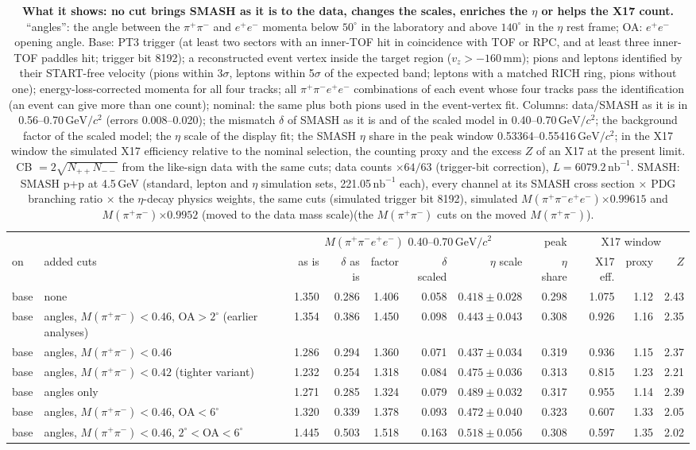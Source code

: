 \documentclass[11pt,a4paper]{article}
\newcommand{\ee}{\ensuremath{e^{+}e^{-}}\xspace}
\newcommand{\pipi}{\ensuremath{\pi^{+}\pi^{-}}\xspace}
\newcommand{\ppee}{\ensuremath{\pi^{+}\pi^{-}e^{+}e^{-}}\xspace}
\newcommand{\Mfour}{\ensuremath{M(\pi^{+}\pi^{-}e^{+}e^{-})}\xspace}
\newcommand{\Mpipi}{\ensuremath{M(\pi^{+}\pi^{-})}\xspace}
\newcommand{\nbinv}{\ensuremath{\mathrm{nb}^{-1}}\xspace}
\newcommand{\GeVcc}{\ensuremath{\mathrm{GeV}/c^{2}}\xspace}
\newcommand{\vz}{\ensuremath{v_z}\xspace}
\newcommand{\ptthree}{PT3 trigger (at least two sectors with an inner-TOF hit in coincidence with TOF or RPC, and at least three
inner-TOF paddles hit; trigger bit 8192)\xspace}
\newcommand{\selid}{pions and leptons identified by their START-free velocity (pions within 3$\sigma$, leptons within 5$\sigma$ of the
expected band; leptons with a matched RICH ring, pions without one); energy-loss-corrected momenta for all four tracks; all \ppee
combinations of each event whose four tracks pass the identification (an event can give more than one count)\xspace}
\newcommand{\selbase}{\ptthree; a reconstructed event vertex inside the target region ($\vz>-160$\,mm); \selid}
\newcommand{\smashsel}{SMASH p+p at 4.5\,GeV (standard, lepton and $\eta$ simulation sets, 221.05\,\nbinv each), every channel at its
SMASH cross section $\times$ PDG branching ratio $\times$ the $\eta$-decay physics weights, the same cuts (simulated trigger bit 8192),
simulated \Mfour$\times0.99615$ and \Mpipi$\times0.9952$ (moved to the data mass scale)\xspace}
\newcommand{\lumisel}{data counts $\times64/63$ (trigger-bit correction), $L=6079.2\,\nbinv$\xspace}
\begin{document}
\begin{table}[!htbp]
\centering
\caption{\textbf{What it shows: no cut brings SMASH as it is to the data, changes the scales, enriches the $\eta$ or helps the X17 count.}
``angles'': the angle between the \pipi and \ee momenta below $50^\circ$ in the laboratory and above $140^\circ$ in the $\eta$ rest frame; OA: \ee
opening angle. Base: \selbase; nominal: the same plus both pions used in the event-vertex fit. Columns: data/SMASH as it is in 0.56--0.70\,\GeVcc
(errors 0.008--0.020); the mismatch $\delta$ of SMASH as it is and of the scaled model in 0.40--0.70\,\GeVcc; the background factor of the scaled
model; the $\eta$ scale of the display fit; the SMASH $\eta$ share in the peak window 0.53364--0.55416\,\GeVcc; in the X17 window the simulated
X17 efficiency relative to the nominal selection, the counting proxy and the excess $Z$ of an X17 at the present limit. CB $=2\sqrt{N_{++}N_{--}}$
from the like-sign data with the same cuts; \lumisel. SMASH: \smashsel (the \Mpipi cuts on the moved \Mpipi).}
\label{tab:typcuts}
\scriptsize
\setlength{\tabcolsep}{2.5pt}
\begin{tabular}{@{}l >{\raggedright\arraybackslash}p{3.9cm} r r r r r r r r r@{}}
\toprule
 & & \multicolumn{5}{c}{\Mfour 0.40--0.70\,\GeVcc} & peak & \multicolumn{3}{c}{X17 window} \\
\cmidrule(lr){3-7}\cmidrule(lr){9-11}
on & added cuts & as is & $\delta$ as is & factor & $\delta$ scaled & $\eta$ scale & $\eta$ share & X17 eff. & proxy & $Z$ \\
\midrule
base & none & 1.350 & 0.286 & 1.406 & 0.058 & $0.418\pm0.028$ & 0.298 & 1.075 & 1.12 & 2.43 \\
base & angles, \Mpipi$<0.46$, OA$>2^\circ$ (earlier analyses) & 1.354 & 0.386 & 1.450 & 0.098 & $0.443\pm0.043$ & 0.308 & 0.926 & 1.16 & 2.35 \\
base & angles, \Mpipi$<0.46$ & 1.286 & 0.294 & 1.360 & 0.071 & $0.437\pm0.034$ & 0.319 & 0.936 & 1.15 & 2.37 \\
base & angles, \Mpipi$<0.42$ (tighter variant) & 1.232 & 0.254 & 1.318 & 0.084 & $0.475\pm0.036$ & 0.313 & 0.815 & 1.23 & 2.21 \\
base & angles only & 1.271 & 0.285 & 1.324 & 0.079 & $0.489\pm0.032$ & 0.317 & 0.955 & 1.14 & 2.39 \\
base & angles, \Mpipi$<0.46$, OA$<6^\circ$ & 1.320 & 0.339 & 1.378 & 0.093 & $0.472\pm0.040$ & 0.323 & 0.607 & 1.33 & 2.05 \\
base & angles, \Mpipi$<0.46$, $2^\circ<$OA$<6^\circ$ & 1.445 & 0.503 & 1.518 & 0.163 & $0.518\pm0.056$ & 0.308 & 0.597 & 1.35 & 2.02 \\

\end{tabular}
\end{table}
\end{document}
